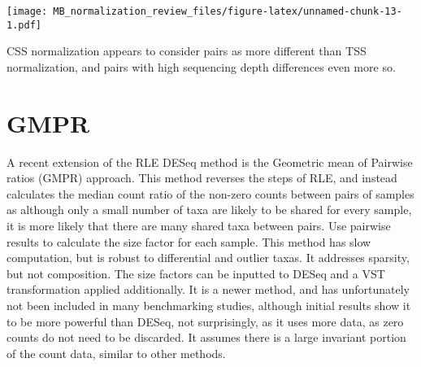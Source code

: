 \documentclass[
]{book}
\begin{document}
\texttt{[image: MB\_normalization\_review\_files/figure-latex/unnamed-chunk-13-1.pdf]}

CSS normalization appears to consider pairs as more different than TSS normalization, and pairs with high sequencing depth differences even more so.

\hypertarget{gmpr}{%
\chapter{GMPR}\label{gmpr}}

A recent extension of the RLE DESeq method is the Geometric mean of Pairwise ratios (GMPR) approach. This method reverses the steps of RLE, and instead calculates the median count ratio of the non-zero counts between pairs of samples as although only a small number of taxa are likely to be shared for every sample, it is more likely that there are many shared taxa between pairs. Use pairwise results to calculate the size factor for each sample. This method has slow computation, but is robust to differential and outlier taxas. It addresses sparsity, but not composition.
The size factors can be inputted to DESeq and a VST transformation applied additionally. It is a newer method, and has unfortunately not been included in many benchmarking studies, although initial results show it to be more powerful than DESeq, not surprisingly, as it uses more data, as zero counts do not need to be discarded. It assumes there is a large invariant portion of the count data, similar to other methods.
\end{document}
